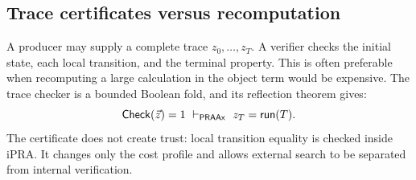 \subsection{Trace certificates versus recomputation}

A producer may supply a complete trace \(z_0,\ldots,z_T\).  A verifier checks
the initial state, each local transition, and the terminal property.  This is
often preferable when recomputing a large calculation in the object term
would be expensive.  The trace checker is a bounded Boolean fold, and its
reflection theorem gives:
\[
  \mathsf{Check}(\vec z)=1
   \ \vdash_{\mathsf{PRAAx}}\
  z_T=\mathsf{run}(T).
\]
The certificate does not create trust: local transition equality is checked
inside iPRA.  It changes only the cost profile and allows external search to be
separated from internal verification.
